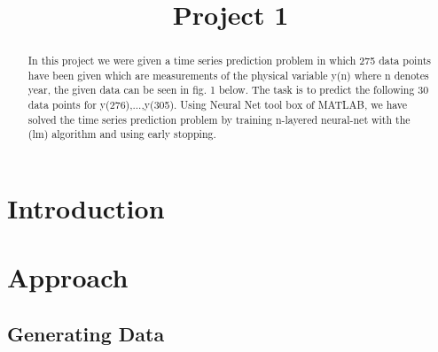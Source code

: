 \documentclass[conference]{IEEEtran}
\begin{document}
\title{Project 1}

\author{
	\and
{}
\and	
{}
	
	
}


\maketitle


\begin{abstract}
In this project we were given a time series prediction problem in which 275 data points have been given which are measurements of the physical variable y(n) where n denotes year, the given data can be seen in fig. 1 below. The task is to predict the following 30 data points for y(276),...,y(305). Using Neural Net tool box of MATLAB, we have solved the time series prediction problem by training n-layered neural-net with the (lm) algorithm and using early stopping.



\end{abstract}

\section{Introduction}


\section{Approach}


\subsection{Generating Data}
\end{document}
